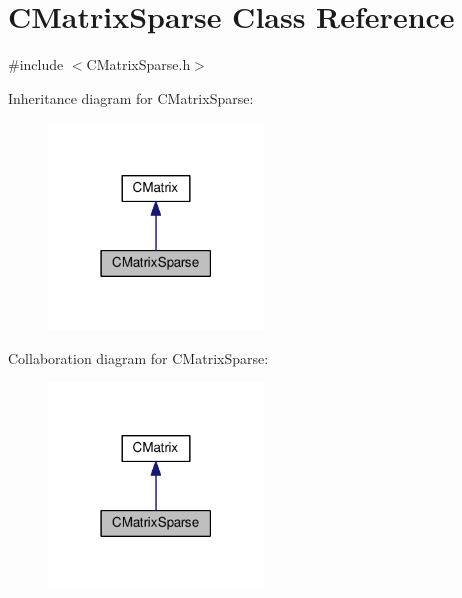 \hypertarget{classCMatrixSparse}{}\section{C\+Matrix\+Sparse Class Reference}
\label{classCMatrixSparse}


{\ttfamily \#include $<$C\+Matrix\+Sparse.\+h$>$}



Inheritance diagram for C\+Matrix\+Sparse\+:\nopagebreak
\begin{figure}[H]
\begin{center}
\leavevmode
\includegraphics[width=162pt]{classCMatrixSparse__inherit__graph}
\end{center}
\end{figure}


Collaboration diagram for C\+Matrix\+Sparse\+:\nopagebreak
\begin{figure}[H]
\begin{center}
\leavevmode
\includegraphics[width=162pt]{classCMatrixSparse__coll__graph}
\end{center}
\end{figure}
